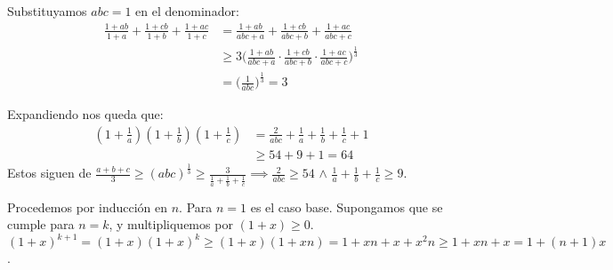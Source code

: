 \begin{sol}
	Substituyamos $abc = 1$ en el denominador:
	\begin{align}
	\frac{1+ab}{1+a}+\frac{1+cb}{1+b}+\frac{1+ac}{1+c} &= \frac{1+ab}{abc+a}+\frac{1+cb}{abc+b}+\frac{1+ac}{abc+c}\\
	& \geq 3 \bigg(\frac{1+ab}{abc+a}\cdot \frac{1+cb}{abc+b}\cdot\frac{1+ac}{abc+c}\bigg)^{\frac{1}{3}} \\
	&= \bigg( \frac{1}{abc} \bigg) ^{\frac{1}{3}} = 3 
	\end{align}
\end{sol}

\begin{sol}
	Expandiendo nos queda que:
	\begin{align}
	(1+\frac{1}{a})(1+\frac{1}{b})(1+\frac{1}{c}) &= \frac{2}{abc} + \frac{1}{a}+\frac{1}{b} + \frac{1}{c} + 1 \\
	&\geq 54 + 9 +1 =  64
	\end{align}
	Estos siguen de $\frac{a+b+c}{3} \geq (abc)^{\frac{1}{3}} \geq \frac{3}{\frac{1}{a}+\frac{1}{b} + \frac{1}{c}} \implies \frac{2}{abc} \geq 54$ $\land$ $\frac{1}{a}+\frac{1}{b} + \frac{1}{c} \geq 9$. 
\end{sol}

\begin{sol}
	Procedemos por inducci\'on en $n$. Para $n = 1$ es el caso base. Supongamos que se cumple para $n = k$, y multipliquemos por $(1+x)\geq 0$. $(1+x)^{k+1} = (1+x)(1+x)^{k} \geq (1+x)(1+xn) = 1+xn+x+x^2n \geq 1+xn+x = 1+ (n+1)x$. 
\end{sol}

